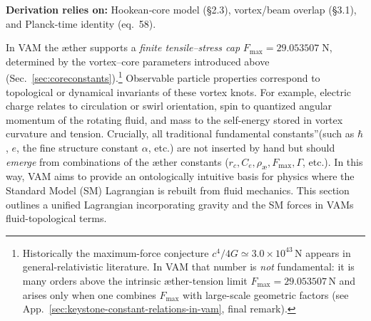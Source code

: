 \begin{center}
    \footnotesize
    \textbf{Derivation relies on:} Hookean‐core model (§2.3), vortex/beam overlap (§3.1), and Planck-time identity (eq.~58).
\end{center}

In VAM the æther supports a \emph{finite tensile--stress cap}  \(F_{\max}=29.053507\;\text{N}\), determined by the vortex--core parameters introduced above (Sec.~\ref{sec:coreconstants}).\footnote{Historically the maximum-force conjecture $c^{4}/4G\simeq3.0\times10^{43}$\,N appears in general-relativistic literature.  In VAM that number is \emph{not} fundamental: it is many orders above the intrinsic æther-tension limit \(F_{\max}=29.053507\)\,N and arises only when one combines $F_{\max}$ with large-scale geometric factors (see App.~\ref{sec:keystone-constant-relations-in-vam}, final remark).
}
Observable particle properties correspond to topological or dynamical invariants of these vortex knots. For example, electric charge relates to circulation or swirl orientation, spin to quantized angular momentum of the rotating fluid, and mass to the self-energy stored in vortex curvature and tension. Crucially, all traditional \grqq fundamental constants\textquotedblright (such as $\hbar$, $e$, the fine structure constant $\alpha$, etc.) are not inserted by hand but should \textit{emerge} from combinations of the æther constants ($r_c, C_e, \rho_{\text{\ae}}, F_{\max}, \Gamma$, etc.). In this way, VAM aims to provide an ontologically intuitive basis for physics where the Standard Model (SM) Lagrangian is rebuilt from fluid mechanics. This section outlines a unified Lagrangian incorporating gravity and the SM forces in VAM\rqs s fluid-topological terms.
